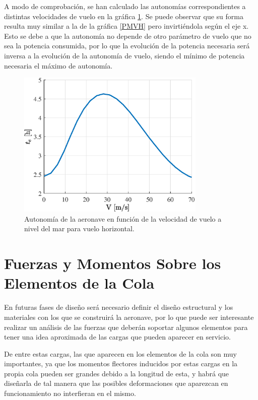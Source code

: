 A modo de comprobación, se han calculado las autonomías correspondientes a distintas velocidades de vuelo en la gráfica \ref{teVH}. Se puede observar que su forma resulta muy similar a la de la gráfica \ref{PMVH} pero invirtiéndola según el eje x. Esto se debe a que la autonomía no depende de otro parámetro de vuelo que no sea la potencia consumida, por lo que la evolución de la potencia necesaria será inversa a la evolución de la autonomía de vuelo, siendo el mínimo de potencia necesaria el máximo de autonomía.

\begin{figure}
	\centering
	\includegraphics[width=90mm]{graficos/teVH}
	\caption{Autonomía de la aeronave en función de la velocidad de vuelo a nivel del mar para vuelo horizontal.}
	\label{teVH}
\end{figure}

\section{Fuerzas y Momentos Sobre los Elementos de la Cola}

En futuras fases de diseño será necesario definir el diseño estructural y los materiales con los que se construirá la aeronave, por lo que puede ser interesante realizar un análisis de las fuerzas que deberán soportar algunos elementos para tener una idea aproximada de las cargas que pueden aparecer en servicio.

De entre estas cargas, las que aparecen en los elementos de la cola son muy importantes, ya que los momentos flectores inducidos por estas cargas en la propia cola pueden ser grandes debido a la longitud de esta, y habrá que diseñarla de tal manera que las posibles deformaciones que aparezcan en funcionamiento no interfieran en el mismo.

